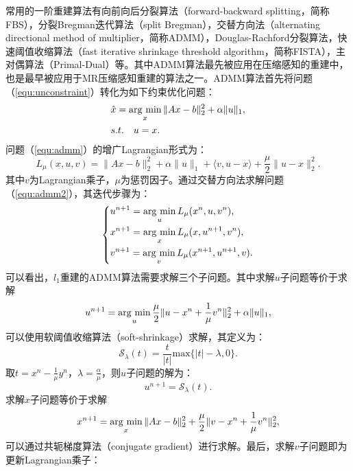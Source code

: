 常用的一阶重建算法有向前向后分裂算法（forward-backward splitting\cite{fbs}，简称FBS），分裂Bregman迭代算法（split Bregman\cite{sb}），交替方向法（alternating directional method of multiplier\cite{admm,ramani2010parallel,boyd2011distributed,yang2011alternating}，简称ADMM），Douglas-Rachford分裂算法\cite{dr}，快速阈值收缩算法（fast iterative shrinkage threshold algorithm\cite{fista}，简称FISTA），主对偶算法（Primal-Dual\cite{pd}）等。其中ADMM算法最先被应用在压缩感知的重建中，也是最早被应用于MR压缩感知重建的算法之一。ADMM算法首先将问题（\ref{equ:unconstraint}）转化为如下约束优化问题：
\begin{equation}
\begin{aligned}
	&\hat{x}=\argmin_x \|Ax-b\|_2^2 + \alpha\|u\|_1,\\
	& s.t. \quad u=x.
\end{aligned}
\label{equ:admm}
\end{equation}
问题（\ref{equ:admm}）的增广Lagrangian形式为：
\begin{equation}
	L_\mu(x,u,v)=\|Ax-b\|^2_2+\alpha\|u\|_1+\langle v,u-x\rangle +\frac{\mu}{2}\|u-x\|_2^2.
\label{equ:admm2}
\end{equation}
其中$v$为Lagrangian乘子，$\mu$为惩罚因子。通过交替方向法求解问题（\ref{equ:admm2}），其迭代步骤为：
\begin{equation}
\left\{
	\begin{aligned}
		& u^{n+1}=\argmin_u L_\mu(x^n,u,v^n),\\
		& x^{n+1}=\argmin_x L_\mu(x,u^{n+1},v^n),\\
		& v^{n+1}=\argmin_v L_\mu(x^{n+1},u^{n+1},v).
	\end{aligned}
\right.
\label{equ:admm3}
\end{equation}
可以看出，$l_1$重建的ADMM算法需要求解三个子问题。其中求解$u$子问题等价于求解
$$u^{n+1}=\argmin_u \frac{\mu}{2}\|u-x^n+\frac{1}{\mu}v^n\|_2^2+\alpha\|u\|_1,$$
可以使用软阈值收缩算法（soft-shrinkage）求解，其定义为：
$$\mathscr{S}_\lambda(t)=\frac{t}{|t|}\mathrm{max}\{|t|-\lambda,0\}.$$
取$t=x^n-\frac{1}{\mu}y^{n}$，$\lambda=\frac{\alpha}{\mu}$，则$u$子问题的解为：
\begin{equation}
	u^{n+1}=\mathscr{S}_\lambda(t).
	\label{equ:admmu}
\end{equation}
求解$x$子问题等价于求解
\begin{equation}
	x^{n+1}=\argmin_x \|Ax-b\|^2_2+\frac{\mu}{2}\|v-x^n+\frac{1}{\mu}v^n\|_2^2,
	\label{equ:admmx}
\end{equation}
可以通过共轭梯度算法\cite{powell1977restart}（conjugate gradient）进行求解。最后，求解$v$子问题即为更新Lagrangian乘子：
